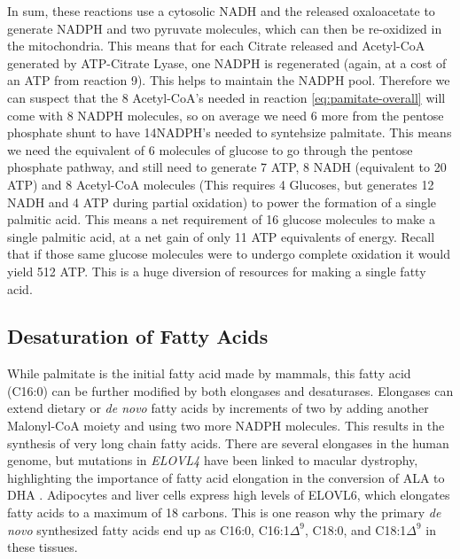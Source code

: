 \documentclass{tufte-handout}
\begin{document}
In sum, these reactions use a cytosolic NADH and the released oxaloacetate to generate NADPH and two pyruvate molecules, which can then be re-oxidized in the mitochondria.  This means that for each Citrate released and Acetyl-CoA generated by ATP-Citrate Lyase, one NADPH is regenerated (again, at a cost of an ATP from reaction 9). This helps to maintain the NADPH pool. Therefore we can suspect that the 8 Acetyl-CoA's needed in reaction \ref{eq:pamitate-overall} will come with 8 NADPH molecules, so on average we need 6 more from the pentose phosphate shunt to have 14NADPH's needed to syntehsize palmitate. This means we need the equivalent of 6 molecules of glucose to go through the pentose phosphate pathway, and still need to generate 7 ATP, 8 NADH (equivalent to 20 ATP) and 8 Acetyl-CoA molecules (This requires  4 Glucoses, but generates 12 NADH and 4 ATP during partial oxidation) to power the formation of a single palmitic acid.  This means a net requirement of 16 glucose molecules to make a single palmitic acid, at a net gain of only 11 ATP equivalents of energy.  Recall that if those same glucose molecules were to undergo complete oxidation it would yield 512 ATP.  This is a huge diversion of resources for making a single fatty acid.

\subsection{Desaturation of Fatty Acids}

While palmitate is the initial fatty acid made by mammals, this fatty acid (C16:0) can be further modified by both elongases and desaturases.  Elongases can extend dietary or \textit{de novo} fatty acids by increments of two by adding another Malonyl-CoA moiety and using two more NADPH molecules.  This results in the synthesis of very long chain fatty acids.  There are several elongases in the human genome, but mutations in \textit{ELOVL4} have been linked to macular dystrophy, highlighting the importance of fatty acid elongation in the conversion of ALA to DHA \citep{Zhang2001}.  Adipocytes and liver cells express high levels of ELOVL6, which elongates fatty acids to a maximum of 18 carbons.  This is one reason why the primary \textit{de novo} synthesized fatty acids end up as C16:0, C16:1$\Delta^9$, C18:0, and C18:1$\Delta^9$ in these tissues.
\end{document}
